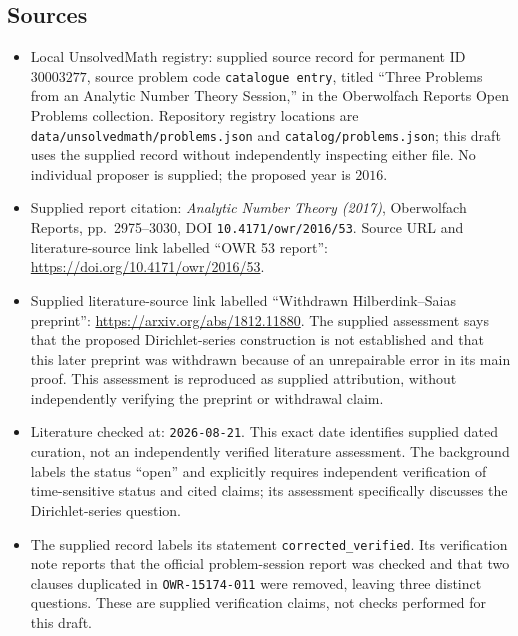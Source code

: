\documentclass[11pt]{article}
\begin{document}
\subsection{Sources}
\begin{itemize}
\item Local UnsolvedMath registry: supplied source record for permanent ID \(30003277\), source problem code \texttt{catalogue entry}, titled ``Three Problems from an Analytic Number Theory Session,'' in the Oberwolfach Reports Open Problems collection. Repository registry locations are \texttt{data/unsolvedmath/problems.json} and \texttt{catalog/problems.json}; this draft uses the supplied record without independently inspecting either file. No individual proposer is supplied; the proposed year is \(2016\).
\item Supplied report citation: \emph{Analytic Number Theory (2017)}, Oberwolfach Reports, pp.\ 2975--3030, DOI \texttt{10.4171/owr/2016/53}. Source URL and literature-source link labelled ``OWR 53 report'': \url{https://doi.org/10.4171/owr/2016/53}.
\item Supplied literature-source link labelled ``Withdrawn Hilberdink--Saias preprint'': \url{https://arxiv.org/abs/1812.11880}. The supplied assessment says that the proposed Dirichlet-series construction is not established and that this later preprint was withdrawn because of an unrepairable error in its main proof. This assessment is reproduced as supplied attribution, without independently verifying the preprint or withdrawal claim.
\item Literature checked at: \texttt{2026-08-21}. This exact date identifies supplied dated curation, not an independently verified literature assessment. The background labels the status ``open'' and explicitly requires independent verification of time-sensitive status and cited claims; its assessment specifically discusses the Dirichlet-series question.
\item The supplied record labels its statement \texttt{corrected\_verified}. Its verification note reports that the official problem-session report was checked and that two clauses duplicated in \texttt{OWR-15174-011} were removed, leaving three distinct questions. These are supplied verification claims, not checks performed for this draft.
\end{itemize}
\end{document}
